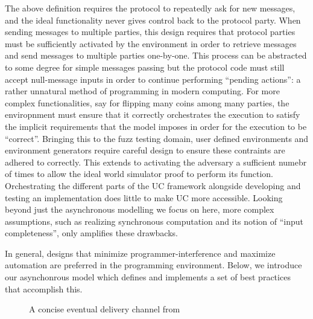 The above definition requires the protocol to repeatedly ask for new messages, and the ideal functionality never gives control back to the protocol party. 
When sending messages to multiple parties, this design requires that protocol parties must be sufficiently activated by the environment in order to retrieve messages and send messages to multiple parties one-by-one. 
This process can be abstracted to some degree for simple messages passing but the protocol code must still accept null-message inputs in order to continue performing ``pending actions'': a rather unnatural method of programming in modern computing. 
For more complex functionalities, say for flipping many coins among many parties, the enviropnment must ensure that it correctly orchestrates the execution to satisfy the implicit requirements that the model imposes in order for the execution to be ``correct''. 
Bringing this to the fuzz testing domain, user defined environments and environment generators require careful design to ensure these contraints are adhered to correctly.
This extends to activating the adversary a sufficient numebr of times to allow the ideal world simulator proof to perform its function.
Orchestrating the different parts of the UC framework alongside developing and testing an implementation does little to make UC more accessible. 
Looking beyond just the asynchronous modelling we focus on here, more complex assumptions, such as realizing synchronous computation and its notion of ``input completeness'', only amplifies these drawbacks.

In general, designs that minimize programmer-interference and maximize automation are preferred in the programming environment. 
Below, we introduce our asynchonrous model which defines and implements a set of best practices that accomplish this.


\begin{figure}

\caption{A concise eventual delivery channel from \cite{katzuc}}
\label{fig:fchanpoll}
\end{figure}


